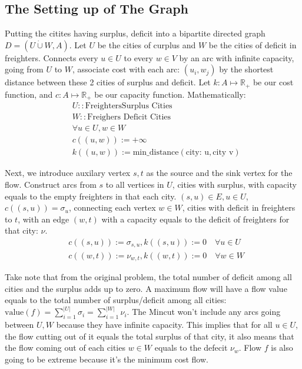\documentclass[]{article}
\theoremstyle{definition}
\begin{document}
    \subsection{The Setting up of The Graph}
        Putting the citites having surplus, deficit into a bipartite directed graph $D = (U\dot\cup W, A)$. Let $U$ be the cities of curplus and $W$ be the cities of deficit in freighters. Connects every $u\in U$ to every $w\in V$ by an arc with infinite capacity, going from $U$ to $W$, associate cost with each arc: $(u_i, w_j)$ by the shortest distance between these 2 cities of surplus and deficit. Let $k: A \mapsto \mathbb R_+$ be our cost function, and $c: A\mapsto \mathbb R_+$ be our capacity function. Mathematically: 
        \begin{align}
            & U:: \text{FreightersSurplus Cities}
            \\
            & W::\text{Freighers Deficit Cities}
            \\
            & \forall u\in U, w\in W
            \\
            & c((u, w)) := +\infty
            \\
            & k((u, w)) := \text{min\_distance}(\text{city: u}, \text{city v})
        \end{align}
        \par
        Next, we introduce auxilary vertex $s, t$ as the source and the sink vertex for the flow. Construct arcs from $s$ to all vertices in $U$, cities with surplus, with capacity equals to the empty freighters in that each city. $(s, u)\in E, u\in U$, $c((s, u)) = \sigma_u$, connecting each vertex $w\in W$, cities with deficit in freighters to $t$, with an edge $(w, t)$ with a capacity equals to the deficit of freighters for that city: $\nu$. 
        \begin{align}
            & c((s, u)) := \sigma_{s, u}, k((s, u)) := 0 \quad \forall u \in U
            \\
            & c((w, t)) := \nu_{w, t}, k((w, t)) := 0\quad \forall w\in W
        \end{align}
        \par
        Take note that from the original problem, the total number of deficit among all cities and the surplus adds up to zero. A maximum flow will have a flow value equals to the total number of surplus/deficit among all cities: $\text{value}(f) = \sum_{i= 1}^{|U|}\sigma_i = \sum_{i = 1}^{|W|}\nu_i$. The Mincut won't include any arcs going between $U, W$ because they have infinite capacity. This implies that for all $u\in U$, the flow cutting out of it equals the total surplus of that city, it also means that the flow coming out of each cities $w\in W$ equals to the defecit $\nu_w$. Flow $f$ is also going to be extreme because it's the minimum cost flow. 
\end{document}
